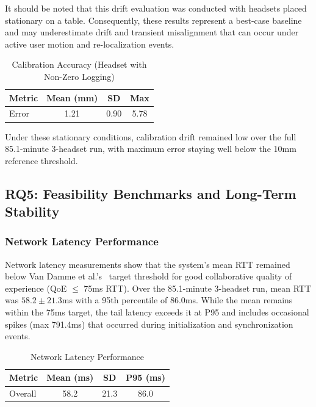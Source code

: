 It should be noted that this drift evaluation was conducted with headsets placed stationary on a table. Consequently, these results represent a best-case baseline and may underestimate drift and transient misalignment that can occur under active user motion and re-localization events.

\begin{table}[h]
\centering
\caption{Calibration Accuracy (Headset with Non-Zero Logging)}
\begin{tabular}{|l|c|c|c|}
\hline
Metric & \textbf{Mean (mm)} & \textbf{SD} & \textbf{Max} \\
\hline
Error & 1.21 & 0.90 & 5.78 \\
\hline
\end{tabular}
\end{table}

Under these stationary conditions, calibration drift remained low over the full 85.1-minute 3-headset run, with maximum error staying well below the 10mm reference threshold.

\subsection{RQ5: Feasibility Benchmarks and Long-Term Stability}

\subsubsection{Network Latency Performance}

Network latency measurements show that the system's mean RTT remained below Van Damme et al.'s~\cite{VanDammeSam2024Iolo} target threshold for good collaborative quality of experience (QoE $\leq$ 75ms RTT). Over the 85.1-minute 3-headset run, mean RTT was $58.2 \pm 21.3$ms with a 95th percentile of 86.0ms. While the mean remains within the 75ms target, the tail latency exceeds it at P95 and includes occasional spikes (max 791.4ms) that occurred during initialization and synchronization events.

\begin{table}[h]
\centering
\caption{Network Latency Performance}
\begin{tabular}{|l|c|c|c|}
\hline
                    	\textbf{Metric} & \textbf{Mean (ms)} & \textbf{SD} & \textbf{P95 (ms)} \\
\hline
Overall & 58.2 & 21.3 & 86.0 \\
\hline
\end{tabular}
\end{table}

